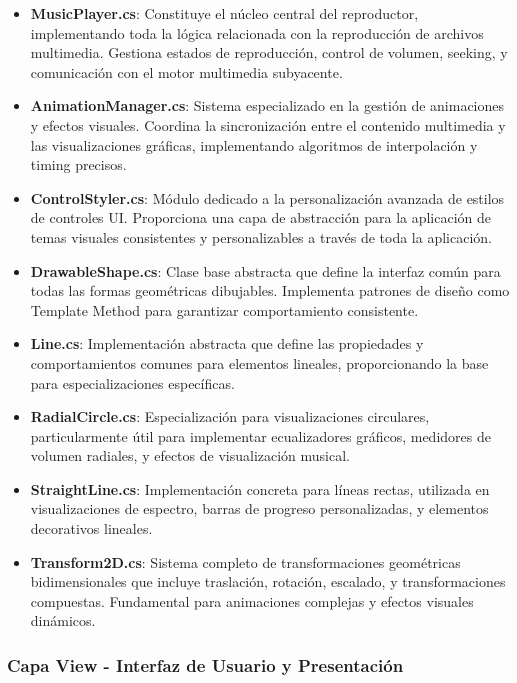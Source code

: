 \documentclass[a4paper]{article}
\begin{document}
\begin{itemize}
\item \textbf{MusicPlayer.cs}: Constituye el núcleo central del reproductor, implementando toda la lógica relacionada con la reproducción de archivos multimedia. Gestiona estados de reproducción, control de volumen, seeking, y comunicación con el motor multimedia subyacente.

\item \textbf{AnimationManager.cs}: Sistema especializado en la gestión de animaciones y efectos visuales. Coordina la sincronización entre el contenido multimedia y las visualizaciones gráficas, implementando algoritmos de interpolación y timing precisos.

\item \textbf{ControlStyler.cs}: Módulo dedicado a la personalización avanzada de estilos de controles UI. Proporciona una capa de abstracción para la aplicación de temas visuales consistentes y personalizables a través de toda la aplicación.

\item \textbf{DrawableShape.cs}: Clase base abstracta que define la interfaz común para todas las formas geométricas dibujables. Implementa patrones de diseño como Template Method para garantizar comportamiento consistente.

\item \textbf{Line.cs}: Implementación abstracta que define las propiedades y comportamientos comunes para elementos lineales, proporcionando la base para especializaciones específicas.

\item \textbf{RadialCircle.cs}: Especialización para visualizaciones circulares, particularmente útil para implementar ecualizadores gráficos, medidores de volumen radiales, y efectos de visualización musical.

\item \textbf{StraightLine.cs}: Implementación concreta para líneas rectas, utilizada en visualizaciones de espectro, barras de progreso personalizadas, y elementos decorativos lineales.

\item \textbf{Transform2D.cs}: Sistema completo de transformaciones geométricas bidimensionales que incluye traslación, rotación, escalado, y transformaciones compuestas. Fundamental para animaciones complejas y efectos visuales dinámicos.
\end{itemize}

\subsubsection{Capa View - Interfaz de Usuario y Presentación}
\end{document}

